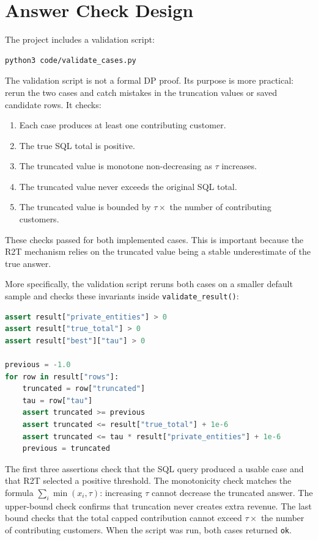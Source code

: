 \documentclass[12pt,a4paper]{report}
\begin{document}
\section{Answer Check Design}

The project includes a validation script:

\begin{lstlisting}[language=Bash]
python3 code/validate_cases.py
\end{lstlisting}

The validation script is not a formal DP proof.  Its purpose is more
practical: rerun the two cases and catch mistakes in the truncation
values or saved candidate rows.  It checks:

\begin{enumerate}
    \item Each case produces at least one contributing customer.
    \item The true SQL total is positive.
    \item The truncated value is monotone non-decreasing as $\tau$
    increases.
    \item The truncated value never exceeds the original SQL total.
    \item The truncated value is bounded by
    $\tau \times$ the number of contributing customers.
\end{enumerate}

These checks passed for both implemented cases.  This is important
because the R2T mechanism relies on the truncated value being a stable
underestimate of the true answer.

More specifically, the validation script reruns both cases on a smaller
default sample and checks these invariants inside
\texttt{validate\_result()}:

\begin{lstlisting}[language=Python]
assert result["private_entities"] > 0
assert result["true_total"] > 0
assert result["best"]["tau"] > 0

previous = -1.0
for row in result["rows"]:
    truncated = row["truncated"]
    tau = row["tau"]
    assert truncated >= previous
    assert truncated <= result["true_total"] + 1e-6
    assert truncated <= tau * result["private_entities"] + 1e-6
    previous = truncated
\end{lstlisting}

The first three assertions check that the SQL query produced a usable
case and that R2T selected a positive threshold.  The monotonicity check
matches the formula $\sum_i \min(x_i,\tau)$: increasing $\tau$ cannot
decrease the truncated answer.  The upper-bound check confirms that
truncation never creates extra revenue.  The last bound checks that the
total capped contribution cannot exceed
$\tau \times$ the number of contributing customers.  When the script was
run, both cases returned \texttt{ok}.
\end{document}
